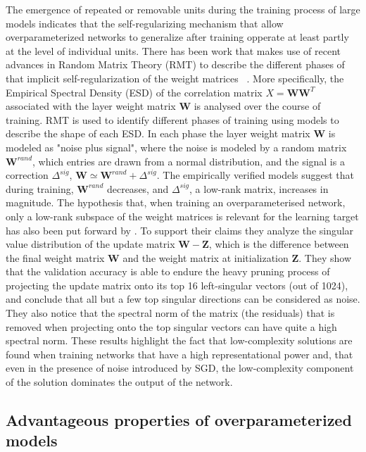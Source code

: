 The emergence of repeated or removable units during the training process of large models indicates that the self-regularizing mechanism that allow overparameterized networks to generalize after training opperate at least partly at the level of individual units. There has been work that makes use of recent advances in Random Matrix Theory (RMT) to describe the different phases of that implicit self-regularization of the weight matrices ~\autocite{martin2018implicit}. More specifically, the Empirical Spectral Density (ESD) of the correlation matrix $X = \mathbf{W}\mathbf{W}^T$ associated with the layer weight matrix $\mathbf{W}$ is analysed over the course of training. RMT is used to identify different phases of training using models to describe the shape of each ESD. In each phase the layer weight matrix $\mathbf{W}$ is modeled as "noise plus signal", where the noise is modeled by a random matrix $\mathbf{W}^{rand}$, which entries are drawn from a normal distribution, and the signal is a correction $\Delta^{sig}$, $\mathbf{W} \simeq \mathbf{W}^{rand} + \Delta^{sig}$. The empirically verified models suggest that during training, $\mathbf{W}^{rand}$ decreases, and $\Delta^{sig}$, a low-rank matrix, increases in magnitude. The hypothesis that, when training an overparameterised network, only a low-rank subspace of the weight matrices is relevant for the learning target has also been put forward by \cite{nagarajan2019uniform}. To support their claims they analyze the singular value distribution of the update matrix $\mathbf{W} - \mathbf{Z}$, which is the difference between the final weight matrix $\mathbf{W}$ and the weight matrix at initialization $\mathbf{Z}$. They show that the validation accuracy is able to endure the heavy pruning process of projecting the update matrix onto its top 16 left-singular vectors (out of 1024), and conclude that all but a few top singular directions can be considered as noise. They also notice that the spectral norm of the matrix (the residuals) that is removed when projecting onto the top singular vectors can have quite a high spectral norm. These results highlight the fact that low-complexity solutions are found when training networks that have a high representational power and, that even in the presence of noise introduced by SGD, the low-complexity component of the solution dominates the output of the network. \\


\subsection{Advantageous properties of overparameterized models}

